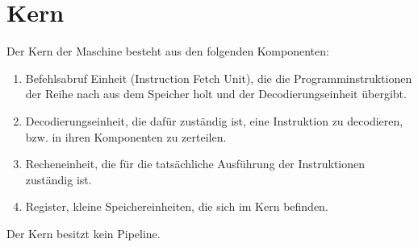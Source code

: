 \section{Kern}
\label{sec:Kern}

Der Kern der Maschine besteht aus den folgenden Komponenten:

\begin{enumerate}
  \item Befehlsabruf Einheit (Instruction Fetch Unit), die die
   Programminstruktionen der Reihe nach aus dem Speicher holt und der
   Decodierungseinheit übergibt.
  \item Decodierungseinheit, die dafür zuständig ist, eine Instruktion zu
    decodieren, bzw. in ihren Komponenten zu zerteilen.
  \item Recheneinheit, die für die tatsächliche Ausführung der Instruktionen
   zuständig ist. 
  \item Register, kleine Speichereinheiten, die sich im Kern befinden.
\end{enumerate}

Der Kern besitzt kein Pipeline.